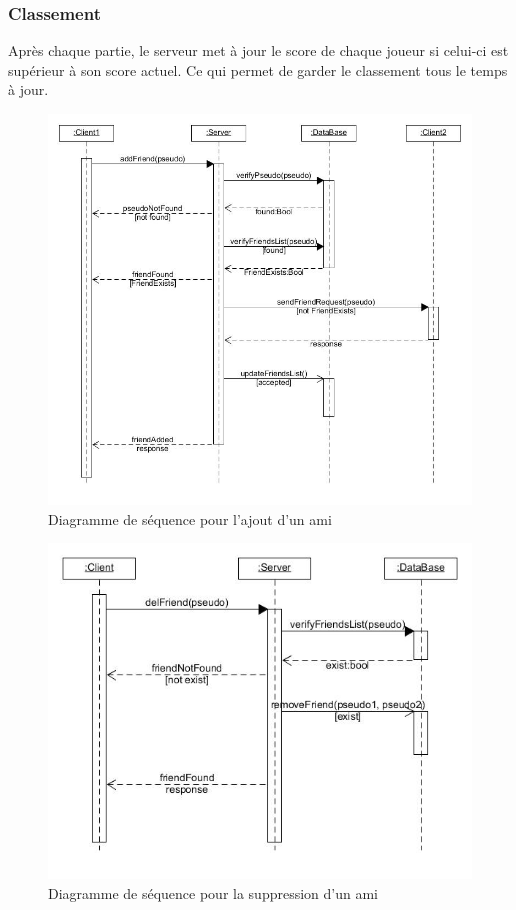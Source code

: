 \documentclass[a4paper,12pt]{article}
\begin{document}
\subsubsection{Classement}

Après chaque partie, le serveur met à jour le score de chaque joueur si celui-ci est supérieur à son score actuel. 
Ce qui permet de garder le classement tous le temps à jour. 

\begin{figure}
\centering
\includegraphics[scale=0.5]{images/add_friend.jpg}
\caption{Diagramme de séquence pour l'ajout d'un ami }
\end{figure}

\newpage
\begin{figure}
\centering
\includegraphics[scale=0.5]{images/del_friend.jpg}
\caption{Diagramme de séquence pour la suppression d'un ami }
\end{figure}
\end{document}
